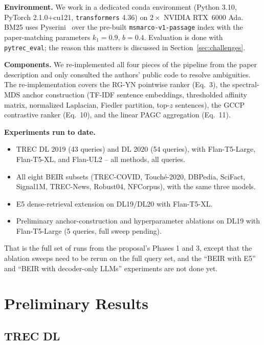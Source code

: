 \documentclass[conference]{IEEEtran}
\begin{document}
\textbf{Environment.} We work in a dedicated conda environment (Python 3.10, PyTorch 2.1.0+cu121, \texttt{transformers} 4.36) on $2\times$ NVIDIA RTX~6000 Ada. BM25 uses Pyserini~\cite{lin2021pyserini} over the pre-built \texttt{msmarco-v1-passage} index with the paper-matching parameters $k_1{=}0.9$, $b{=}0.4$. Evaluation is done with \texttt{pytrec\_eval}; the reason this matters is discussed in Section~\ref{sec:challenges}.

\textbf{Components.} We re-implemented all four pieces of the pipeline from the paper description and only consulted the authors' public code to resolve ambiguities. The re-implementation covers the RG-YN pointwise ranker (Eq.~3), the spectral-MDS anchor construction (TF-IDF sentence embeddings, thresholded affinity matrix, normalized Laplacian, Fiedler partition, top-$z$ sentences), the GCCP contrastive ranker (Eq.~10), and the linear PAGC aggregation (Eq.~11).

\textbf{Experiments run to date.}
\begin{itemize}[nosep,leftmargin=1em]
    \item TREC DL 2019 (43 queries) and DL 2020 (54 queries), with Flan-T5-Large, Flan-T5-XL, and Flan-UL2 -- all methods, all queries.
    \item All eight BEIR subsets (TREC-COVID, Touch\'e-2020, DBPedia, SciFact, Signal1M, TREC-News, Robust04, NFCorpus), with the same three models.
    \item E5 dense-retrieval extension on DL19/DL20 with Flan-T5-XL.
    \item Preliminary anchor-construction and hyperparameter ablations on DL19 with Flan-T5-Large (5 queries, full sweep pending).
\end{itemize}

That is the full set of runs from the proposal's Phases 1 and 3, except that the ablation sweeps need to be rerun on the full query set, and the ``BEIR with E5'' and ``BEIR with decoder-only LLMs'' experiments are not done yet.

\section{Preliminary Results}

\subsection{TREC DL}
\end{document}
